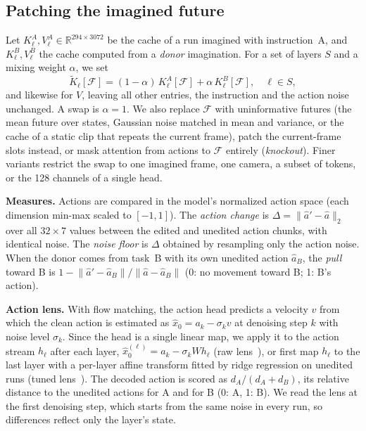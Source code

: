\documentclass[conference]{IEEEtran}
\newcommand{\Fut}{\mathcal{F}}
\begin{document}
\subsection{Patching the imagined future}
Let $K^A_\ell, V^A_\ell \in \mathbb{R}^{294\times 3072}$ be the cache of a run imagined with instruction~A, and
$K^B_\ell, V^B_\ell$ the cache computed from a \emph{donor} imagination. For a set of layers $S$ and a mixing weight
$\alpha$, we set
\begin{equation}
\tilde K_\ell[\Fut] = (1-\alpha)\,K^A_\ell[\Fut] + \alpha\,K^B_\ell[\Fut], \quad \ell \in S,
\label{eq:patch}
\end{equation}
and likewise for $V$, leaving all other entries, the instruction and the action noise unchanged. A swap is $\alpha = 1$.
We also replace $\Fut$ with uninformative futures (the mean future over states, Gaussian noise matched in mean and
variance, or the cache of a static clip that repeats the current frame), patch the current-frame slots instead, or
mask attention from actions to $\Fut$ entirely (\emph{knockout}). Finer variants restrict the swap to one imagined frame,
one camera, a subset of tokens, or the 128 channels of a single head.

\textbf{Measures.} Actions are compared in the model's normalized action space (each dimension min-max scaled to
$[-1,1]$). The \emph{action change} is $\Delta = \lVert \hat a' - \hat a \rVert_2$ over all $32\times7$ values between the
edited and unedited action chunks, with identical noise. The \emph{noise floor} is $\Delta$ obtained by resampling only
the action noise. When the donor comes from task~B with its own unedited action $\hat a_B$, the \emph{pull} toward B is
$1-\lVert \hat a'-\hat a_B\rVert / \lVert \hat a-\hat a_B\rVert$ (0: no movement toward B; 1: B's action).

\textbf{Action lens.} With flow matching, the action head predicts a velocity $v$ from which the clean action is
estimated as $\hat x_0 = a_k - \sigma_k v$ at denoising step $k$ with noise level $\sigma_k$. Since the head is a single
linear map, we apply it to the action stream $h_\ell$ after each layer, $\hat x_0^{(\ell)} = a_k - \sigma_k W h_\ell$
(raw lens~\cite{nostalgebraist2020logitlens}), or first map $h_\ell$ to the last layer with a per-layer affine
transform fitted by ridge regression on unedited runs (tuned lens~\cite{belrose2023tuned}). The decoded action is scored
as $d_A/(d_A+d_B)$, its relative distance to the unedited actions for A and for B (0: A, 1: B). We read the lens at the
first denoising step, which starts from the same noise in every run, so differences reflect only the layer's state.
\end{document}
